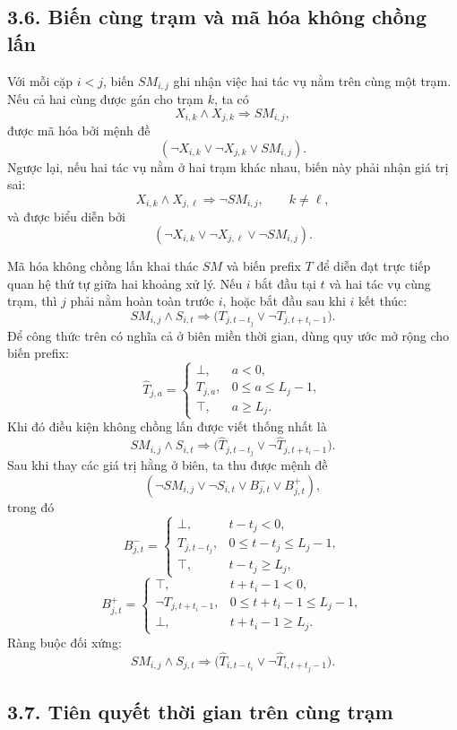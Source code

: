 \documentclass[12pt]{article}
\begin{document}
\subsection*{3.6. Biến cùng trạm và mã hóa không chồng lấn}

Với mỗi cặp $i<j$, biến $SM_{i,j}$ ghi nhận việc hai tác vụ nằm trên cùng một trạm. Nếu cả hai cùng được gán cho trạm $k$, ta có
\[
X_{i,k}\land X_{j,k}\Rightarrow SM_{i,j},
\]
được mã hóa bởi mệnh đề
\[
(\neg X_{i,k}\lor \neg X_{j,k}\lor SM_{i,j}).
\tag{SAT\_12}
\]
Ngược lại, nếu hai tác vụ nằm ở hai trạm khác nhau, biến này phải nhận giá trị sai:
\[
X_{i,k}\land X_{j,\ell}\Rightarrow \neg SM_{i,j},
\qquad k\ne \ell,
\]
và được biểu diễn bởi
\[
(\neg X_{i,k}\lor \neg X_{j,\ell}\lor \neg SM_{i,j}).
\tag{SAT\_13}
\]

Mã hóa không chồng lấn khai thác $SM$ và biến prefix $T$ để diễn đạt trực tiếp quan hệ thứ tự giữa hai khoảng xử lý. Nếu $i$ bắt đầu tại $t$ và hai tác vụ cùng trạm, thì $j$ phải nằm hoàn toàn trước $i$, hoặc bắt đầu sau khi $i$ kết thúc:
\[
SM_{i,j}\land S_{i,t}
\Rightarrow
\Big(T_{j,t-t_j}\lor \neg T_{j,t+t_i-1}\Big).
\]
Để công thức trên có nghĩa cả ở biên miền thời gian, dùng quy ước mở rộng cho biến prefix:
\[
\widehat{T}_{j,a}=
\begin{cases}
\bot,&a<0,\\
T_{j,a},&0\le a\le L_j-1,\\
\top,&a\ge L_j.
\end{cases}
\]
Khi đó điều kiện không chồng lấn được viết thống nhất là
\[
SM_{i,j}\land S_{i,t}
\Rightarrow
\Big(\widehat{T}_{j,t-t_j}\lor \neg \widehat{T}_{j,t+t_i-1}\Big).
\]
Sau khi thay các giá trị hằng ở biên, ta thu được mệnh đề
\[
(\neg SM_{i,j}\lor \neg S_{i,t}\lor B^{-}_{j,t}\lor B^{+}_{j,t}),
\tag{SAT\_14}
\]
trong đó
\[
B^{-}_{j,t}=
\begin{cases}
\bot,&t-t_j<0,\\
T_{j,t-t_j},&0\le t-t_j\le L_j-1,\\
\top,&t-t_j\ge L_j,
\end{cases}
\]
\[
B^{+}_{j,t}=
\begin{cases}
\top,&t+t_i-1<0,\\
\neg T_{j,t+t_i-1},&0\le t+t_i-1\le L_j-1,\\
\bot,&t+t_i-1\ge L_j.
\end{cases}
\]
Ràng buộc đối xứng:
\[
SM_{i,j}\land S_{j,t}
\Rightarrow
\Big(\widehat{T}_{i,t-t_i}\lor \neg \widehat{T}_{i,t+t_j-1}\Big).
\tag{SAT\_15}
\]

\subsection*{3.7. Tiên quyết thời gian trên cùng trạm}
\end{document}
